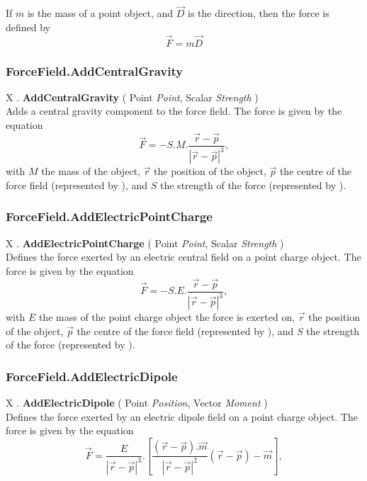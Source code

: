 If $m$ is the mass of a point object, and $\vec{D}$ is the direction, then the force is defined by
\begin{equation}
\vec{F}=m \vec{D}
\end{equation}

\subsubsection{ForceField.AddCentralGravity \label{F:ForceField:AddCentralGravity}}
X . \textbf{AddCentralGravity} ( Point \textit{Point}, Scalar \textit{Strength} ) \\
Adds a central gravity component to the force field.
The force is given by the equation
\begin{equation}
\vec{F}= - S . M . \frac{\vec{r}-\vec{p}}{|\vec{r}-\vec{p}|^3},
\end{equation}
with $M$ the mass of the object, $\vec{r}$ the position of the object, $\vec{p}$ the centre of the force field (represented by ), and $S$ the strength of the force (represented by ).


\subsubsection{ForceField.AddElectricPointCharge \label{F:ForceField:AddElectricPointCharge}}
X . \textbf{AddElectricPointCharge} ( Point \textit{Point}, Scalar \textit{Strength} ) \\
Defines the force exerted by an electric central field on a point charge object.
The force is given by the equation
\begin{equation}
\vec{F}= - S . E . \frac{\vec{r}-\vec{p}}{|\vec{r}-\vec{p}|^3},
\end{equation}
with $E$ the mass of the point charge object the force is exerted on, $\vec{r}$ the position of the object, $\vec{p}$ the centre of the force field (represented by ), and $S$ the strength of the force (represented by ).


\subsubsection{ForceField.AddElectricDipole \label{F:ForceField:AddElectricDipole}}
X . \textbf{AddElectricDipole} ( Point \textit{Position}, Vector \textit{Moment} ) \\
Defines the force exerted by an electric dipole field on a point charge object.
The force is given by the equation
\begin{equation}
\vec{F}= \frac{E}{|\vec{r}-\vec{p}|^3} . 
\left[
 \frac{(\vec{r}-\vec{p}).\vec{m}}{|\vec{r}-\vec{p}|^2} (\vec{r}-\vec{p})
  - \vec{m} 
\right],
\end{equation}

